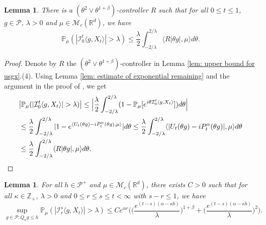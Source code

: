 \documentclass[12pt,a4paper]{amsart}
\theoremstyle{plain}
\newtheorem{lem}[thm]{Lemma}
\theoremstyle{definition}
\numberwithin{equation}{section}
\begin{document}
\begin{lem}
  \label{lem: control pair for P(M>lambda)}
  There is a $(\theta^2\vee\theta^{1+\beta})$-controller $R$ such that for all $0\leq t\leq 1$, $g\in \mathcal P$, $\lambda >0$ and $\mu\in \mathcal M_c(\mathbb R^d)$, we have
  \[
    \mathbb P_\mu ( |\mathcal{I}_0^t\langle g,X_t\rangle| > \lambda)
    \leq \frac{\lambda}{2}\int_{-2/\lambda}^{2/\lambda}\langle R|\theta g|,\mu\rangle d\theta.
  \]
\end{lem}

\begin{proof}
  Denote by $R$ the $(\theta^2\vee\theta^{1+\beta})$-controller in Lemma \ref{lem: upper bound for usgx}.(4).
  Using Lemma \ref{lem: estimate of exponential remaining} and the argument in the proof of \cite[Theorem 3.3.6]{Durrett2010Probability}, we get
  \begin{align}
    & \big|\mathbb P_\mu (|\mathcal{I}_0^t\langle g,X_t\rangle| > \lambda)\big|
      \leq \Big|\frac{\lambda}{2}\int_{-2/\lambda}^{2/\lambda}(1 - \mathbb P_\mu[e^{i\theta \mathcal{I}_0^t\langle g,X_t\rangle}])d\theta\Big| \\
    & \leq \frac{\lambda}{2}\int_{-2/\lambda}^{2/\lambda}|1-e^{\langle U_t(\theta g)-iP^\alpha_t (\theta g),\mu \rangle}|d\theta
    \leq \frac{\lambda}{2}\int_{-2/\lambda}^{2/\lambda}\langle |U_t(\theta g) - iP^\alpha_t(\theta g)|,\mu\rangle d\theta \\ 
    & \leq \frac{\lambda}{2}\int_{-2/\lambda}^{2/\lambda}\langle R|\theta g|,\mu\rangle d\theta.
      \qedhere
  \end{align}
\end{proof}
\begin{lem}
  \label{lem: temp}
  For all $h \in \mathcal P^+$ and $\mu \in \mathcal M_c(\mathbb R^d)$, there exists $C > 0$ such that for all $\kappa \in \mathbb Z_+ $, $\lambda > 0$ and $0\leq r\leq s\leq t<\infty$ with $s-r \leq 1$, we have
  \[
    \sup_{g \in \mathcal P: Q_\kappa g\leq h}\mathbb P_{\mu}(|\mathcal I_r^s\langle g, X_t\rangle|>\lambda)
    \leq C e^{\alpha r} \bigg(\Big( \frac{e^{(t-s)(\alpha - \kappa b)}}{\lambda}\Big)^{1+\beta} + \Big( \frac{e^{(t-s)(\alpha - \kappa b)}}{\lambda}\Big)^{2} \bigg).
  \]
\end{lem}
\end{document}
